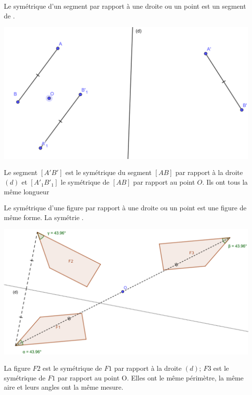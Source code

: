 \documentclass[12pt,a4paper]{article}
\begin{document}
\begin{myprop}
	Le symétrique d'un segment par rapport à une droite ou un point est un segment de . 
\end{myprop}

\begin{myex}
	\begin{center}
		\includegraphics[scale=0.2]{sym_seg}
	\end{center}

Le segment $[A'B']$ est le symétrique du segment $[AB]$ par rapport à la droite $(d)$ et $[A'_1B'_1]$ le symétrique de $[AB]$ par rapport au point $O$. 
Ils ont tous la même longueur

	
\end{myex}

\begin{myprop}
	Le symétrique d'une figure par rapport à une droite ou un point est une figure de même forme. La symétrie .
\end{myprop}

\begin{myex}
	\begin{center}
		\includegraphics[scale=0.2]{sym_figures}
	\end{center}
	
	La figure $F2$ est le symétrique de $F1$ par rapport à la droite $(d)$; $F3$ est le symétrique de $F1$ par rapport au point O.
	Elles ont le même périmètre, la même aire et leurs angles ont la même mesure.
\end{myex}
\end{document}
